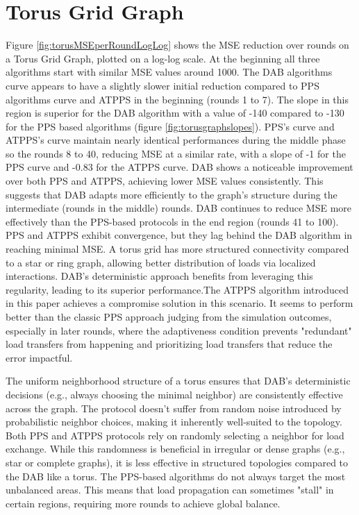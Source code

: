 \section{Torus Grid Graph}\label{sec:torusgridGraph}
Figure \ref{fig:torusMSEperRoundLogLog} shows the MSE reduction over rounds on a Torus Grid Graph, plotted on a log-log scale. At the beginning all three algorithms start with similar MSE values around 1000. The DAB algorithms curve appears to have a slightly slower initial reduction compared to PPS algorithms curve and ATPPS in the beginning (rounds 1 to 7). The slope in this region is superior for the DAB algorithm with a value of -140 compared to -130 for the PPS based algorithms (figure \ref{fig:torusgraphslopes}). PPS's curve and ATPPS's curve maintain nearly identical performances during the middle phase so the rounds 8 to 40, reducing MSE at a similar rate, with a slope of -1 for the PPS curve and -0.83 for the ATPPS curve. DAB shows a noticeable improvement over both PPS and ATPPS, achieving lower MSE values consistently. This suggests that DAB adapts more efficiently to the graph's structure during the intermediate (rounds in the middle) rounds. DAB continues to reduce MSE more effectively than the PPS-based protocols in the end region (rounds 41 to 100). PPS and ATPPS exhibit convergence, but they lag behind the DAB algorithm in reaching minimal MSE. A torus grid has more structured connectivity compared to a star or ring graph, allowing better distribution of loads via localized interactions. DAB's deterministic approach benefits from leveraging this regularity, leading to its superior performance.The ATPPS algorithm introduced in this paper achieves a compromise solution in this scenario. It seems to perform better than the classic PPS approach judging from the simulation outcomes, especially in later rounds, where the adaptiveness condition prevents "redundant" load transfers from happening and prioritizing load transfers that reduce the error impactful.

The uniform neighborhood structure of a torus ensures that DAB's deterministic decisions (e.g., always choosing the minimal neighbor) are consistently effective across the graph. The protocol doesn't suffer from random noise introduced by probabilistic neighbor choices, making it inherently well-suited to the topology. Both PPS and ATPPS protocols rely on randomly selecting a neighbor for load exchange. While this randomness is beneficial in irregular or dense graphs (e.g., star or complete graphs), it is less effective in structured topologies compared to the DAB like a torus. The PPS-based algorithms do not always target the most unbalanced areas. This means that load propagation can sometimes "stall" in certain regions, requiring more rounds to achieve global balance.

